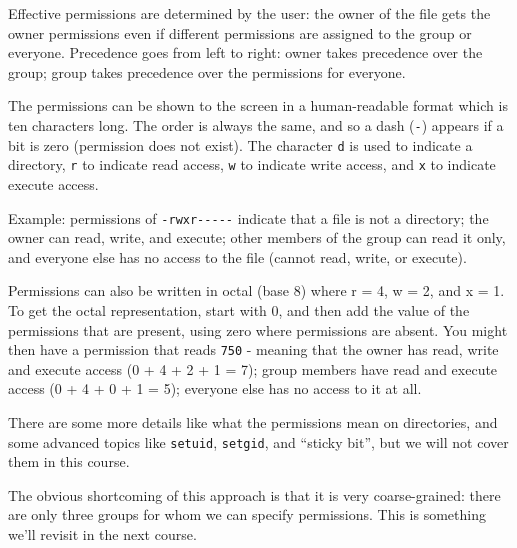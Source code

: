 Effective permissions are determined by the user: the owner of the file gets the owner permissions even if different permissions are assigned to the group or everyone. Precedence goes from left to right: owner takes precedence over the group; group takes precedence over the permissions for everyone.

The permissions can be shown to the screen in a human-readable format which is ten characters long. The order is always the same, and so a dash (\texttt{-}) appears if a bit is zero (permission does not exist). The character \texttt{d} is used to indicate a directory, \texttt{r} to indicate read access, \texttt{w} to indicate write access, and \texttt{x} to indicate execute access.

Example: permissions of \texttt{-rwxr{-}{-}{-}{-}{-}} indicate that a file is not a directory; the owner can read, write, and execute; other members of the group can read it only, and everyone else has no access to the file (cannot read, write, or execute).

Permissions can also be written in octal (base 8) where r = 4, w = 2, and x = 1. To get the octal representation, start with 0, and then add the value of the  permissions that are present, using zero where permissions are absent. You might then have a permission that reads \texttt{750} - meaning that the owner has read, write and execute access (0 + 4 + 2 + 1 = 7); group members have read and execute access (0 + 4 + 0 + 1 = 5); everyone else has no access to it at all.

There are some more details like what the permissions mean on directories, and some advanced topics like \texttt{setuid}, \texttt{setgid}, and ``sticky bit'', but we will not cover them in this course.

The obvious shortcoming of this approach is that it is very coarse-grained: there are only three groups for whom we can specify permissions. This is something we'll revisit in the next course.



